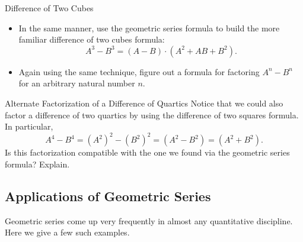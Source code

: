 \begin{exercise}{Difference of Two Cubes}
\begin{itemize}
\item In the same manner, use the geometric series formula to build the more familiar difference of two cubes formula: $$A^3-B^3=(A-B)\cdot\left(A^2+AB+B^2\right).$$
\vspace*{1in}
\item Again using the same technique, figure out a formula for factoring $A^n-B^n$ for an arbitrary natural number $n$.
\vspace*{1in}
\end{itemize}
\end{exercise}

\begin{exercise}{Alternate Factorization of a Difference of Quartics \Coffeecup}
Notice that we could also factor a difference of two quartics by using the difference of two squares formula.  In particular, $$A^4-B^4=\left(A^2\right)^2-\left(B^2\right)^2=\left(A^2-B^2\right)=\left(A^2+B^2\right).$$  Is this factorization compatible with the one we found via the geometric series formula?  Explain.
\vspace*{.5in}
\end{exercise}
\subsection{Applications of Geometric Series}\label{AppleCations}

Geometric series come up very frequently in almost any quantitative discipline.  Here we give a few such examples.

